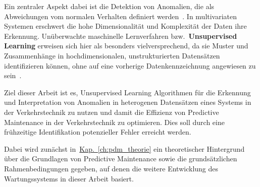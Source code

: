 Ein zentraler Aspekt dabei ist die Detektion von Anomalien, die als Abweichungen vom normalen Verhalten definiert
werden~\cite{Chandola2009}. In multivariaten Systemen erschwert die hohe Dimensionalität und Komplexität der Daten ihre Erkennung.
Unüberwachte maschinelle Lernverfahren bzw.~\textbf{Unsupervised Learning} erweisen sich hier als besonders vielversprechend,
da sie Muster und Zusammenhänge in hochdimensionalen, unstrukturierten Datensätzen identifizieren können, ohne auf eine vorherige
Datenkennzeichnung angewiesen zu sein~\cite{Chandola2009, Wenig2024}.

Ziel dieser Arbeit ist es, Unsupervised Learning Algorithmen für die Erkennung und Interpretation von Anomalien in
heterogenen Datensätzen eines Systems in der Verkehrstechnik zu nutzen und damit die Effizienz von Predictive Maintenance
in der Verkehrstechnik zu optimieren. Dies soll durch eine frühzeitige Identifikation potenzieller Fehler erreicht werden.

Dabei wird zunächst in~\hyperref[ch:pdm_theorie]{Kap.~\ref*{ch:pdm_theorie}} ein theoretischer Hintergrund über die Grundlagen
von Predictive Maintenance sowie die grundsätzlichen Rahmenbedingungen gegeben, auf denen die weitere Entwicklung des Wartungssystems
in dieser Arbeit basiert.
